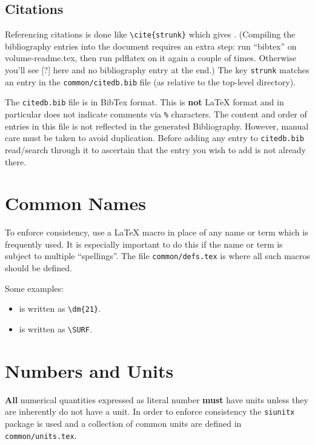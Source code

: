 \subsection{Citations}

Referencing citations is done like \verb|\cite{strunk}| which gives \cite{strunk}.
(Compiling the bibliography entries into the document requires an extra step: run ``bibtex'' on
 volume-readme.tex, then run pdflatex on it again a couple of times. Otherwise you'll see [?] here 
 and no bibliography entry at the end.) 
The key \texttt{strunk} matches an entry in the \texttt{common/citedb.bib}
file (as relative to the top-level directory).


The \texttt{citedb.bib} file is in BibTex format.
This is \textbf{not} \LaTeX{} format and in particular does not
indicate comments via \texttt{\%} characters.
The content and order of entries in this file is not reflected in the
generated Bibliography.
However, manual care must be taken to avoid duplication.
Before adding any entry to \texttt{citedb.bib} read/search through it
to ascertain that the entry you wish to add is not already there.

\section{Common Names}

To enforce consistency, use a \LaTeX{} macro in place of any name or
term which is frequently used.
It is especially important to do this if the name or term is subject
to multiple ``spellings''.
The file \texttt{common/defs.tex} is where all such macros should be defined.

Some examples:

\begin{itemize}
\item {} is written as \verb|\dm{21}|.
\item \SURF is written as \verb|\SURF|.
\end{itemize}

\section{Numbers and Units}

\textbf{All} numerical quantities expressed as literal number
\textbf{must} have units unless they are inherently do not have a unit.
In order to enforce consistency the \texttt{siunitx} package is used
and a collection of common units are defined in
\texttt{common/units.tex}.


